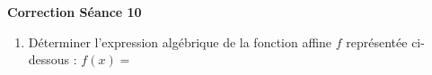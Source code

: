 \documentclass[a4paper,11pt]{article}
\begin{document}
\begin{center}

\textbf{\textcolor{Couleur8}{Correction Séance 10}}\\
\vspace{2mm}

\end{center}


\newpage


\begin{seance}{} %
\begin{enumerate}
\item Déterminer l'expression algébrique de la fonction affine $f$ représentée ci-dessous : $f(x)=$\dotfill
\begin{center}
\begin{tikzpicture}[baseline,scale = 0.3]


\end{tikzpicture}
\end{center}
\end{enumerate}
\end{seance}
\end{document}
